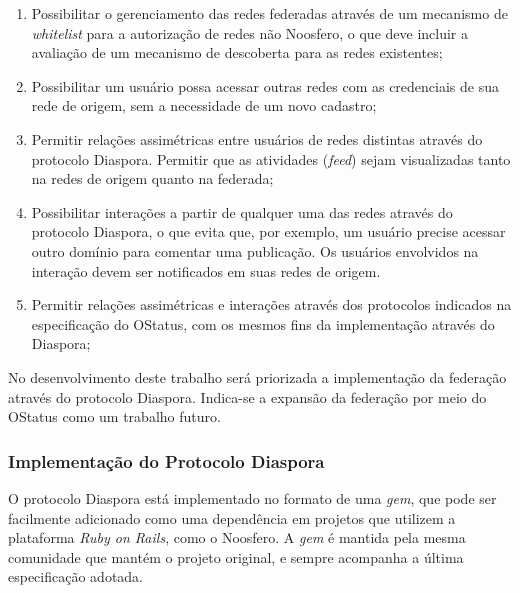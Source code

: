 \begin{enumerate}
  \item{Possibilitar o gerenciamento das redes federadas através de um  mecanismo de 
        \textit{whitelist} para a autorização de redes não Noosfero, o que deve
        incluir a avaliação de um mecanismo de descoberta para as redes existentes;}

  \item{Possibilitar um usuário possa acessar outras redes com as credenciais de sua
        rede de origem, sem a necessidade de um novo cadastro;}

  \item{Permitir relações assimétricas entre usuários de redes distintas através do
        protocolo Diaspora. Permitir que as atividades (\textit{feed}) sejam
        visualizadas tanto na redes de origem quanto na federada;}

  \item{Possibilitar interações a partir de qualquer uma das redes através do
        protocolo Diaspora, o que evita que, por exemplo, um usuário precise acessar
        outro domínio para comentar uma publicação. Os usuários envolvidos na
        interação devem ser notificados em suas redes de origem.}

  \item{Permitir relações assimétricas e interações através dos protocolos indicados
        na especificação do OStatus, com os mesmos fins da implementação através do
        Diaspora;}
\end{enumerate}

No desenvolvimento deste trabalho será priorizada a implementação da federação
através do protocolo Diaspora. Indica-se a expansão da federação por meio do OStatus
como um trabalho futuro.

\subsubsection{Implementação do Protocolo Diaspora}


O protocolo Diaspora está implementado no formato de uma \textit{gem}, que pode ser
facilmente adicionado como uma dependência em projetos que utilizem a plataforma
\textit{Ruby on Rails}, como o Noosfero. A \textit{gem} é mantida pela mesma
comunidade que mantém o projeto original, e sempre acompanha a última especificação
adotada.

